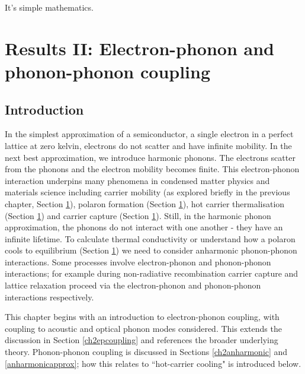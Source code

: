 \begin{savequote}[8cm]
It's simple mathematics.
\end{savequote}

\chapter{\label{ch:5-epcoupling}Results II: Electron-phonon and phonon-phonon coupling}
\section{Introduction} \label{ch5:introduction}

In the simplest approximation of a semiconductor, a single electron in a perfect lattice at zero kelvin, electrons do not scatter and have infinite mobility. In the next best approximation, we introduce harmonic phonons. The electrons scatter from the phonons and the electron mobility becomes finite. This electron-phonon interaction underpins many phenomena in condensed matter physics and materials science including carrier mobility (as explored briefly in the previous chapter, Section \ref{}), polaron formation (Section \ref{}), hot carrier thermalisation (Section \ref{}) and carrier capture (Section \ref{}). Still, in the harmonic phonon approximation, the phonons do not interact with one another - they have an infinite lifetime. To calculate thermal conductivity or understand how a polaron cools to equilibrium (Section \ref{}) we need to consider anharmonic phonon-phonon interactions. Some processes involve electron-phonon and phonon-phonon interactions; for example during non-radiative recombination carrier capture and lattice relaxation proceed via the electron-phonon and phonon-phonon interactions respectively. 

This chapter begins with an introduction to electron-phonon coupling, with coupling to acoustic and optical phonon modes considered. This extends the discussion in Section \ref{ch2epcoupling} and references the broader underlying theory. Phonon-phonon coupling is discussed in Sections \ref{ch2anharmonic} and \ref{anharmonicapprox}; how this relates to ``hot-carrier cooling" is introduced below.

